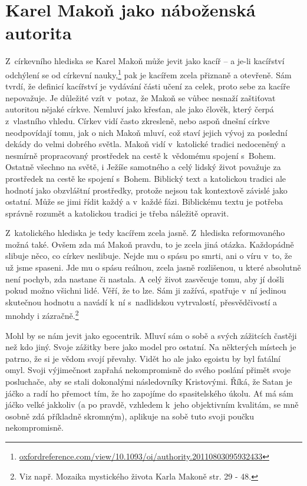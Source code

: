 \section{Karel Makoň jako náboženská autorita}

Z~církevního hlediska se Karel Makoň může jevit jako kacíř -- a je-li kacířství odchýlení se od
církevní
nauky,\footnote{\href{https://www.oxfordreference.com/view/10.1093/oi/authority.20110803095932433}{oxfordreference.com/view/10.1093/oi/authority.20110803095932433}}
pak je kacířem zcela přiznaně a otevřeně. Sám tvrdí, že definicí
kacířství je vydávání části učení za celek, proto sebe za kacíře nepovažuje. Je
důležité vzít v~potaz, že Makoň se vůbec nesnaží zaštiťovat autoritou nějaké
církve. Nemluví jako křesťan, ale jako člověk, který čerpá z~vlastního vhledu.
Církev vidí často zkresleně, nebo aspoň dnešní církve neodpovídají tomu, jak o
nich Makoň mluví, což staví jejich vývoj za poslední dekády do velmi dobrého
světla. Makoň vidí v~katolické tradici nedoceněný a nesmírně propracovaný
prostředek na cestě k~vědomému spojení s~Bohem. Ostatně všechno na světě, i
Ježíše samotného a celý lidský život považuje za prostředek na cestě ke spojení
s~Bohem. Biblický text a katolickou tradici ale hodnotí jako obzvláštní
prostředky, protože nejsou tak kontextově závislé jako ostatní. Může se jimi
řídit každý a v~každé fázi. Biblickému textu je potřeba správně rozumět a
katolickou tradici je třeba náležitě opravit.

Z~katolického hlediska je tedy kacířem zcela jasně. Z~hlediska reformovaného
možná také. Ovšem zda má Makoň pravdu, to je zcela jiná otázka. Každopádně
slibuje něco, co církev neslibuje. Nejde mu o spásu po smrti, ani o víru v~to,
že už jsme spaseni. Jde mu o spásu reálnou, zcela jasně rozlišenou, u které
absolutně není pochyb, zda nastane či nastala. A celý život zasvěcuje tomu, aby
jí došli pokud možno všichni lidé. Věří, že to lze. Sám ji zažívá, spatřuje v~ní
jedinou skutečnou hodnotu a navádí k~ní s~nadlidskou vytrvalostí, přesvědčivostí
a mnohdy i zázračně.\footnote{Viz např. Mozaika mystického života Karla Makoně
str. 29 - 48.}

Mohl by se nám jevit jako egocentrik. Mluví sám o sobě a svých zážitcích častěji
než kdo jiný. Svoje zážitky bere jako model pro ostatní. Na některých místech je
patrno, že si je vědom svojí převahy. Vidět ho ale jako egoistu by byl
fatální omyl. Svoji výjimečnost zapřahá nekompromisně do svého poslání přimět
svoje posluchače, aby se stali dokonalými následovníky Kristovými. Říká, že
Satan je jáčko a radí ho přemoct tím, že ho zapojíme do spasitelského úkolu. Ať
má sám jáčko velké jakkoliv (a po pravdě, vzhledem k~jeho objektivním kvalitám,
se mně osobně zdá příkladně skromným), aplikuje na sobě tuto svoji poučku
nekompromisně.

